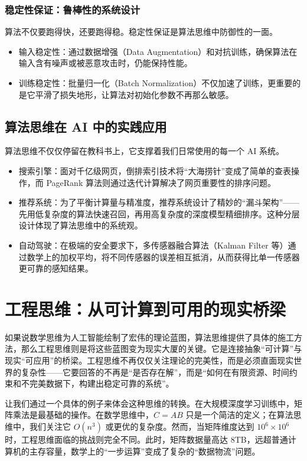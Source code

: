 \subsubsection{稳定性保证：鲁棒性的系统设计}

算法不仅要跑得快，还要跑得稳。稳定性保证是算法思维中防御性的一面。 
\begin{itemize} 
  \item 输入稳定性：通过数据增强（Data Augmentation）和对抗训练，确保算法在输入含有噪声或被恶意攻击时，仍能保持性能。 
  \item 训练稳定性：批量归一化（Batch Normalization）不仅加速了训练，更重要的是它平滑了损失地形，让算法对初始化参数不再那么敏感。 
\end{itemize}

\subsection{算法思维在 AI 中的实践应用}

算法思维不仅仅停留在教科书上，它支撑着我们日常使用的每一个 AI 系统。 
\begin{itemize} 
  \item 搜索引擎：面对千亿级网页，倒排索引技术将“大海捞针”变成了简单的查表操作，而 PageRank 算法则通过迭代计算解决了网页重要性的排序问题。 
  \item 推荐系统：为了平衡计算量与精准度，推荐系统设计了精妙的“漏斗架构”——先用低复杂度的算法快速召回，再用高复杂度的深度模型精细排序。这种分层设计体现了算法思维中的系统观。 
  \item 自动驾驶：在极端的安全要求下，多传感器融合算法（Kalman Filter 等）通过数学上的加权平均，将不同传感器的误差相互抵消，从而获得比单一传感器更可靠的感知结果。 
\end{itemize}

\section{工程思维：从可计算到可用的现实桥梁}

如果说数学思维为人工智能绘制了宏伟的理论蓝图，算法思维提供了具体的施工方法，那么工程思维则是将这些蓝图变为现实大厦的关键。它是连接抽象“可计算”与现实“可应用”的桥梁。工程思维不再仅仅关注理论的完美性，而是必须直面现实世界的复杂性——它要回答的不再是“是否存在解”，而是“如何在有限资源、时间约束和不完美数据下，构建出稳定可靠的系统”。

让我们通过一个具体的例子来体会这种思维的转换。在大规模深度学习训练中，矩阵乘法是最基础的操作。在数学思维中，$C = AB$ 只是一个简洁的定义；在算法思维中，我们关注它 $O(n^3)$ 或更优的复杂度。然而，当矩阵维度达到 $10^6 \times 10^6$ 时，工程思维面临的挑战则完全不同。此时，矩阵数据量高达 8TB，远超普通计算机的主存容量，数学上的“一步运算”变成了复杂的“数据物流”问题。

